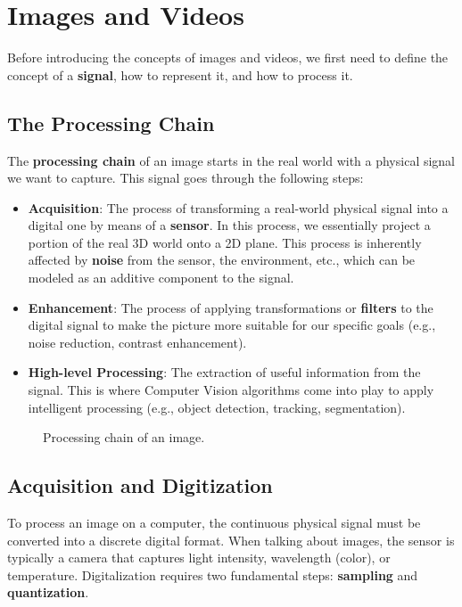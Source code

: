 \section{Images and Videos}
Before introducing the concepts of images and videos, we first need to define the concept of a \textbf{signal}, how to represent it, and how to process it.

\subsection{The Processing Chain}
The \textbf{processing chain} of an image starts in the real world with a physical signal we want to capture. This signal goes through the following steps:
\begin{itemize}
    \item \textbf{Acquisition}: The process of transforming a real-world physical signal into a digital one by means of a \textbf{sensor}. In this process, we essentially project a portion of the real 3D world onto a 2D plane. This process is inherently affected by \textbf{noise} from the sensor, the environment, etc., which can be modeled as an additive component to the signal.
    \item \textbf{Enhancement}: The process of applying transformations or \textbf{filters} to the digital signal to make the picture more suitable for our specific goals (e.g., noise reduction, contrast enhancement).
    \item \textbf{High-level Processing}: The extraction of useful information from the signal. This is where Computer Vision algorithms come into play to apply intelligent processing (e.g., object detection, tracking, segmentation).
\end{itemize}

\begin{figure}[H]
    \centering
    \scalebox{0.8}{
        
    }
    \caption{Processing chain of an image.}
\end{figure}


\subsection{Acquisition and Digitization}
To process an image on a computer, the continuous physical signal must be converted into a discrete digital format. 
When talking about images, the sensor is typically a camera that captures light intensity, wavelength (color), or temperature. 
Digitalization requires two fundamental steps: \textbf{sampling} and \textbf{quantization}.

